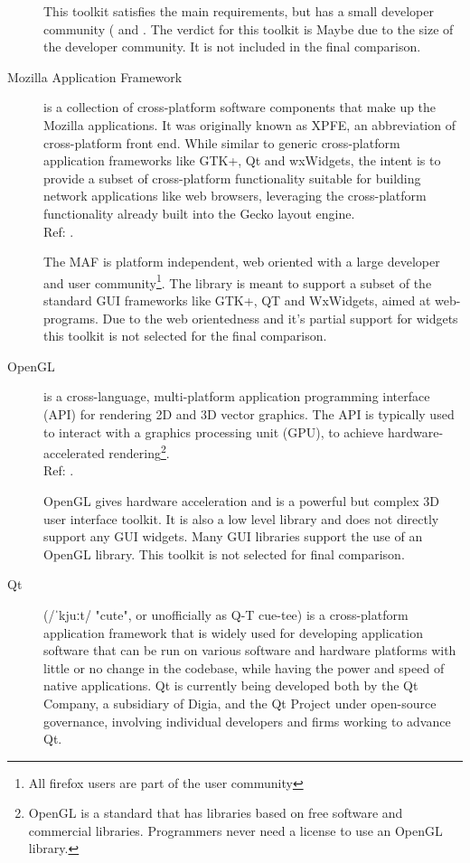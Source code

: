 \begin{description}
		This toolkit satisfies the main requirements, but has a small developer
		community (\cite{wiki:cegui} and \cite{cegui:cegui}. The verdict for
		this toolkit is Maybe due to the size of the developer community. It is
		not included in the final comparison.

    \item[Mozilla Application Framework]
		 is a collection of cross-platform software components that
		 make up the Mozilla applications. It was originally known as
		 XPFE, an abbreviation of cross-platform front end.
		 While similar to generic cross-platform application
		 frameworks like GTK+, Qt and wxWidgets, the intent is to
		 provide a subset of cross-platform functionality suitable for
		 building network applications like web browsers, leveraging
		 the cross-platform functionality already built into the Gecko
		 layout engine.
		 \hspace*{\fill}\\Ref: \cite{wiki:mozilla_application_framework}.

		 The MAF is platform independent, web oriented with a large developer
		 and user community\footnote{All firefox users are part of the user
		 community}.  The library is meant to support a subset of the standard
		 GUI frameworks like GTK+, QT and WxWidgets, aimed at web-programs. Due
		 to the web orientedness and it's partial support for widgets this
		 toolkit is not selected for the final comparison.

    \item[OpenGL] is a cross-language, multi-platform application programming
		interface (API) for rendering 2D and 3D vector graphics.
		The API is typically used to interact with a graphics
		processing unit (GPU), to achieve hardware-accelerated
		rendering\footnote{OpenGL is a standard that has libraries based on free
		software and commercial libraries. Programmers never need a license
		to use an OpenGL library.}.
		\hspace*{\fill}\\Ref: \cite{wiki:opengl}.

		OpenGL gives hardware acceleration and is a powerful but complex 3D
		user interface toolkit. It is also a low level library and does not
		directly support any GUI widgets. Many GUI libraries support the use of
		an OpenGL library. This toolkit is not selected for final comparison.

    \item[Qt]  (/ˈkjuːt/ "cute", or unofficially as Q-T cue-tee) is a cross-platform
		application framework that is widely used for developing application
		software that can be run on various software and hardware platforms
		with little or no change in the codebase, while having the power and
		speed of native applications. Qt is currently being developed both
		by the Qt Company, a subsidiary of Digia, and the Qt Project under
		open-source governance, involving individual developers and firms
		working to advance Qt.


\end{description}
